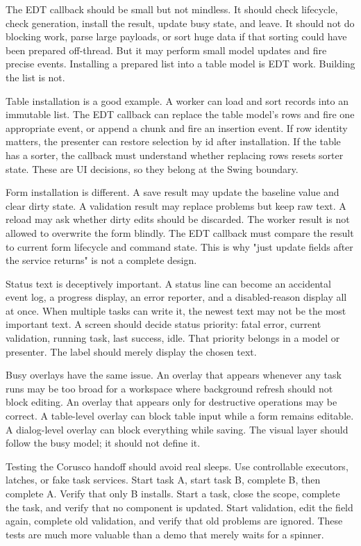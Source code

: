 The EDT callback should be small but not mindless. It should check lifecycle, check generation, install the result, update busy state, and leave. It should not do blocking work, parse large payloads, or sort huge data if that sorting could have been prepared off-thread. But it may perform small model updates and fire precise events. Installing a prepared list into a table model is EDT work. Building the list is not.

Table installation is a good example. A worker can load and sort records into an immutable list. The EDT callback can replace the table model's rows and fire one appropriate event, or append a chunk and fire an insertion event. If row identity matters, the presenter can restore selection by id after installation. If the table has a sorter, the callback must understand whether replacing rows resets sorter state. These are UI decisions, so they belong at the Swing boundary.

Form installation is different. A save result may update the baseline value and clear dirty state. A validation result may replace problems but keep raw text. A reload may ask whether dirty edits should be discarded. The worker result is not allowed to overwrite the form blindly. The EDT callback must compare the result to current form lifecycle and command state. This is why "just update fields after the service returns" is not a complete design.

Status text is deceptively important. A status line can become an accidental event log, a progress display, an error reporter, and a disabled-reason display all at once. When multiple tasks can write it, the newest text may not be the most important text. A screen should decide status priority: fatal error, current validation, running task, last success, idle. That priority belongs in a model or presenter. The label should merely display the chosen text.

Busy overlays have the same issue. An overlay that appears whenever any task runs may be too broad for a workspace where background refresh should not block editing. An overlay that appears only for destructive operations may be correct. A table-level overlay can block table input while a form remains editable. A dialog-level overlay can block everything while saving. The visual layer should follow the busy model; it should not define it.

Testing the Corusco handoff should avoid real sleeps. Use controllable executors, latches, or fake task services. Start task A, start task B, complete B, then complete A. Verify that only B installs. Start a task, close the scope, complete the task, and verify that no component is updated. Start validation, edit the field again, complete old validation, and verify that old problems are ignored. These tests are much more valuable than a demo that merely waits for a spinner.

